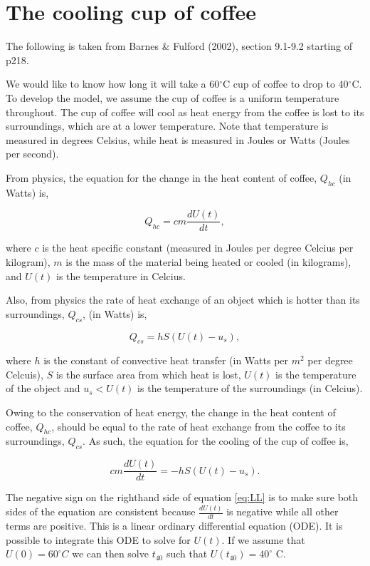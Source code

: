 \documentclass[]{book}
\begin{document}
\section{The cooling cup of coffee}\label{the-cooling-cup-of-coffee}

The following is taken from Barnes \& Fulford (2002), section 9.1-9.2
starting of p218.

We would like to know how long it will take a 60\(^\circ\)C cup of
coffee to drop to 40\(^\circ\)C. To develop the model, we assume the cup
of coffee is a uniform temperature throughout. The cup of coffee will
cool as heat energy from the coffee is lost to its surroundings, which
are at a lower temperature. Note that temperature is measured in degrees
Celsius, while heat is measured in Joules or Watts (Joules per second).

From physics, the equation for the change in the heat content of coffee,
\(Q_{hc}\) (in Watts) is,

\begin{equation}
Q_{hc} = cm \frac{dU(t)}{dt},
\end{equation}

where \(c\) is the heat specific constant (measured in Joules per degree
Celcius per kilogram), \(m\) is the mass of the material being heated or
cooled (in kilograms), and \(U(t)\) is the temperature in Celcius.

Also, from physics the rate of heat exchange of an object which is
hotter than its surroundings, \(Q_{cs}\), (in Watts) is,

\begin{equation}
Q_{cs} = hS(U(t)-u_s),
\end{equation}

where \(h\) is the constant of convective heat transfer (in Watts per
\(m^2\) per degree Celcuis), \(S\) is the surface area from which heat
is lost, \(U(t)\) is the temperature of the object and \(u_s<U(t)\) is
the temperature of the surroundings (in Celcius).

Owing to the conservation of heat energy, the change in the heat content
of coffee, \(Q_{hc}\), should be equal to the rate of heat exchange from
the coffee to its surroundings, \(Q_{cs}\). As such, the equation for
the cooling of the cup of coffee is,

\begin{equation}
cm \frac{dU(t)}{dt}=-hS(U(t)-u_s).
\label{eq:LL}
\end{equation}

The negative sign on the righthand side of equation \eqref{eq:LL} is to
make sure both sides of the equation are consistent because
\(\frac{dU(t)}{dt}\) is negative while all other terms are positive.
This is a linear ordinary differential equation (ODE). It is possible to
integrate this ODE to solve for \(U(t)\). If we assume that
\(U(0) = 60^\circ C\) we can then solve \(t_{40}\) such that
\(U(t_{40}) = 40^\circ\) C.
\end{document}
